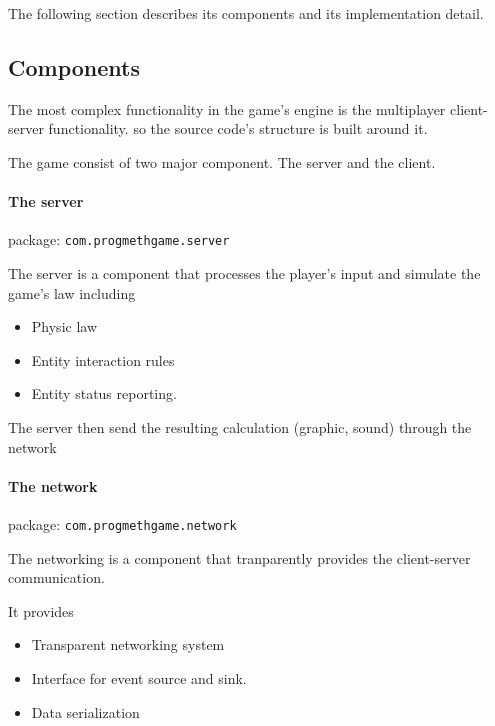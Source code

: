 \documentclass{article}
\providecommand{\tightlist}{%
	\setlength{\itemsep}{0pt}\setlength{\parskip}{0pt}}
\begin{document}
The following section describes its components and its implementation
detail.

\hypertarget{components}{%
\subsection{Components}\label{components}}

The most complex functionality in the game's engine is the multiplayer
client-server functionality. so the source code's structure is built
around it.

The game consist of two major component. The server and the client.

\hypertarget{the-server}{%
\paragraph{The server}\label{the-server}}

package: \texttt{com.progmethgame.server}

The server is a component that processes the player's input and simulate
the game's law including

\begin{itemize}
\tightlist
\item
  Physic law
\item
  Entity interaction rules
\item
  Entity status reporting.
\end{itemize}

The server then send the resulting calculation (graphic, sound) through
the network

\hypertarget{the-network}{%
\paragraph{The network}\label{the-network}}

package: \texttt{com.progmethgame.network}

The networking is a component that tranparently provides the
client-server communication.

It provides

\begin{itemize}
\tightlist
\item
  Transparent networking system
\item
  Interface for event source and sink.
\item
  Data serialization
\end{itemize}
\end{document}
